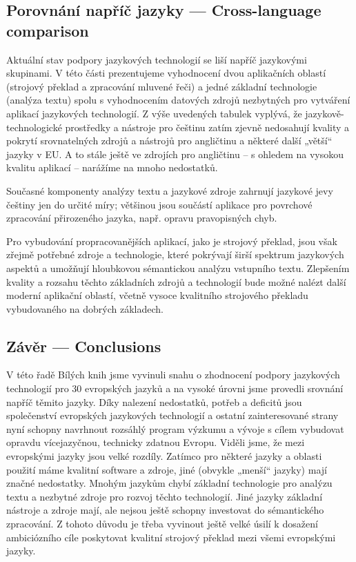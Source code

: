 \documentclass[]{../../metanetpaper}
\begin{document}
\begin{multicols}{2}
\subsection{Porovnání napříč jazyky --- Cross-language comparison}

Aktuální stav podpory jazykových technologií se liší napříč jazykovými skupinami. V této části prezentujeme vyhodnocení dvou aplikačních oblastí (strojový překlad a zpracování mluvené řeči) a jedné základní technologie (analýza textu) spolu s vyhodnocením datových zdrojů nezbytných pro vytváření aplikací jazykových technologií. 
Z výše uvedených tabulek vyplývá, že jazykově-technologické prostředky a nástroje pro češtinu zatím zjevně nedosahují kvality a pokrytí srovnatelných zdrojů a nástrojů pro angličtinu a některé další „větší“ jazyky v EU. A to stále ještě ve zdrojích pro angličtinu – s ohledem na vysokou kvalitu aplikací – narážíme na mnoho nedostatků. 

Současné komponenty analýzy textu a jazykové zdroje zahrnují jazykové jevy češtiny jen do určité míry; většinou jsou součástí aplikace pro povrchové zpracování přirozeného jazyka, např. opravu pravopisných chyb. 

Pro vybudování propracovanějších aplikací, jako je strojový překlad, jsou však zřejmě potřebné zdroje a technologie, které pokrývají širší spektrum jazykových aspektů a umožňují hloubkovou sémantickou analýzu vstupního textu. Zlepšením kvality a rozsahu těchto základních zdrojů a technologií bude možné nalézt další moderní aplikační oblastí, včetně vysoce kvalitního strojového překladu vybudovaného na dobrých základech.

\subsection{Závěr --- Conclusions}

V této řadě Bílých knih jsme vyvinuli snahu o zhodnocení podpory jazykových technologií pro 30 evropských jazyků a na vysoké úrovni jsme provedli srovnání napříč těmito jazyky. Díky nalezení nedostatků, potřeb a deficitů jsou společenství evropských jazykových technologií a ostatní zainteresované strany nyní schopny navrhnout rozsáhlý program výzkumu a vývoje s cílem vybudovat opravdu vícejazyčnou, technicky zdatnou Evropu. Viděli jsme, že mezi evropskými jazyky jsou velké rozdíly. Zatímco pro některé jazyky a oblasti použití máme kvalitní software a zdroje, jiné (obvykle „menší“ jazyky) mají značné nedostatky. Mnohým jazykům chybí základní technologie pro analýzu textu a nezbytné zdroje pro rozvoj těchto technologií. Jiné jazyky základní nástroje a zdroje mají, ale nejsou ještě schopny investovat do sémantického zpracování. Z tohoto důvodu je třeba vyvinout ještě velké úsilí k dosažení ambiciózního cíle poskytovat kvalitní strojový překlad mezi všemi evropskými jazyky. 


\end{multicols}
\end{document}

